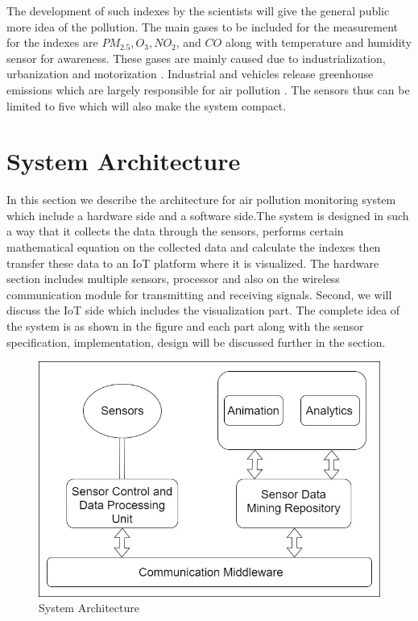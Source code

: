 The development of such indexes by the scientists will give the general public more idea of the pollution. The main gases to be included for the measurement for the indexes are  $PM_{2.5}, O_3, NO_2$, and $CO$ along with temperature and humidity sensor for awareness. These gases are mainly caused due to industrialization, urbanization and motorization \cite{Saha1952}. Industrial and vehicles release greenhouse emissions which are largely responsible for air pollution \cite{ internet}. The sensors thus can be limited to five which will also make the system compact.

\section{System Architecture}
    
     In this section we describe the architecture for air pollution monitoring system which include a hardware side and a software side.The system is designed in such a way that it collects the data through the sensors, performs certain mathematical equation on the collected data and calculate the indexes then transfer these data to an IoT platform where it is visualized. The hardware section includes multiple sensors, processor and also on the wireless communication module for transmitting and receiving signals. Second, we will discuss the IoT side which includes the visualization part. The complete idea of the system is as shown in the figure and each part along with the sensor specification, implementation, design will be discussed further in the section. 


     \begin{figure}[h]
      \begin{center}
      \includegraphics[scale=0.70]{images/figure2.png}
      \end{center}
      \caption{System Architecture}
      \label{mesh}
  
    \end{figure}


